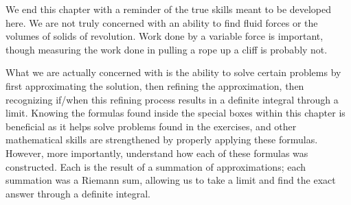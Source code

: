 We end this chapter with a reminder of the true skills meant to be developed here. We are not truly concerned with an ability to find fluid forces or the volumes of solids of revolution. Work done by a variable force is important, though measuring the work done in pulling a rope up a cliff is probably not.

What we are actually concerned with is the ability to solve certain problems by first approximating the solution, then refining the approximation, then recognizing if/when this refining process results in a definite integral through a limit. Knowing the formulas found inside the special boxes within this chapter is beneficial as it helps solve problems found in the exercises, and other mathematical skills are strengthened by properly applying these formulas. However, more importantly, understand how each of these formulas was constructed. Each is the result of a summation of approximations; each summation was a Riemann sum, allowing us to take a limit and find the exact answer through a definite integral. \\


